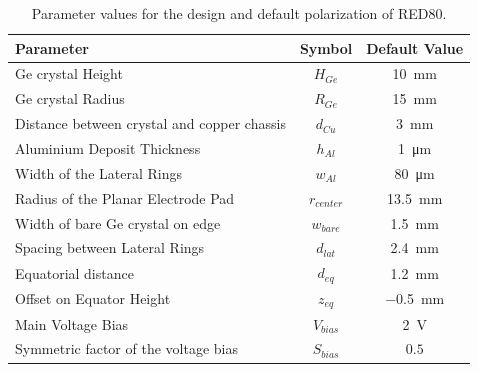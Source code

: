 \begin{table}[]
\centering
\begin{tabular}{l c S}
Parameter                                   & Symbol        & {Default Value} \\ \hline \hline
Ge crystal Height                           & $H_{Ge}$      & \SI{10}{\mm}  \\
Ge crystal Radius                           & $R_{Ge}$      & \SI{15}{\mm}    \\
Distance between crystal and copper chassis & $d_{Cu}$      & \SI{3}{\mm}     \\
Aluminium Deposit Thickness                         & $h_{Al}$      & \SI{1}{\micro\meter}   \\
Width of the Lateral Rings                      & $w_{Al}$      & \SI{80}{\micro\meter}  \\
Radius of the Planar Electrode Pad  & $r_{center}$   & \SI{13.5}{\mm}   \\
Width of bare Ge crystal on edge     & $w_{bare}$    & \SI{1.5}{\mm}  \\
Spacing between Lateral Rings          & $d_{lat}$  & \SI{2.4}{\mm}  \\
Equatorial distance						& $d_{eq}$	& \SI{1.2}{\mm} \\
Offset on Equator Height				& $z_{eq}$	& \SI{-0.5}{\mm} \\
Main Voltage Bias                           & $V_{bias}$    & \SI{2}{\volt}      \\
Symmetric factor of the voltage bias        & $S_{bias}$    & {$0.5$}         
\end{tabular}
\caption{Parameter values for the design and default polarization of RED80.}
\label{tab:red80-default-parameters}
\end{table}

